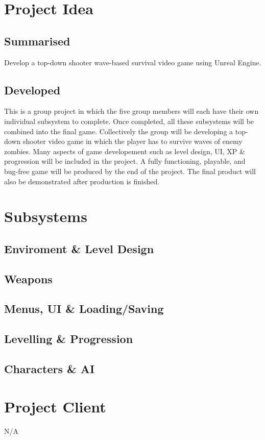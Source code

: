\documentclass[11pt]{article}
\begin{document}
\section*{Project Idea}
\subsection*{Summarised}
Develop a top-down shooter wave-based survival video game using Unreal Engine.
\subsection*{Developed}
This is a group project in which the five group members will each have their own individual subsystem to complete. Once completed, all these subsystems will be
combined into the final game. Collectively the group will be developing a top-down
shooter video game in which the player has to survive waves of enemy zombies. 
Many aspects of game developement such as level design, UI, XP \& progression will be included in the project. A fully functioning, playable, and bug-free game will
be produced by the end of the project. The final product will also be demonstrated
after production is finished.

\section*{Subsystems}
\subsection*{Enviroment \& Level Design}
\subsection*{Weapons}
\subsection*{Menus, UI \& Loading/Saving}
\subsection*{Levelling \& Progression}
\subsection*{Characters \& AI}

\section*{Project Client}
N/A
\end{document}
